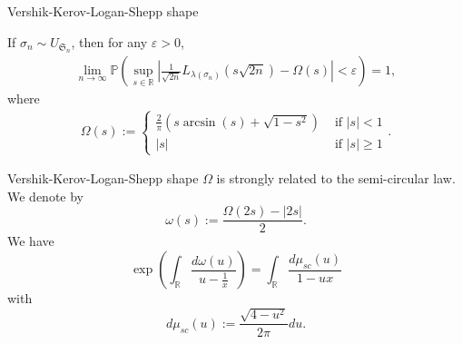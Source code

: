 \documentclass[english,xcolor=table]{beamer}
\begin{document}
\begin{frame}{Vershik-Kerov-Logan-Shepp shape}
    \begin{theorem}
    If $\sigma_n \sim U_{\mathfrak{S}_n}$, then for any $\varepsilon>0$,
\begin{align*}
\lim_{n\to \infty} \mathbb{P}\left(\sup_{s\in \mathbb{R}} \left|\frac{1}{\sqrt{2n}}L_{\lambda(\sigma_n)}\left({s}{\sqrt{2n}}\right)-\Omega(s)\right|<\varepsilon\right) =1,
\end{align*}
where
\begin{align*}
\Omega(s):=\begin{cases}
\frac{2}{\pi}(s\arcsin({s})+\sqrt{1-s^2}) & \text{ if } |s|<1 \\ 
|s| & \text{ if } |s|\geq 1 
\end{cases}.
\end{align*}
    \end{theorem}
    \vspace{10 mm}
\end{frame}
\begin{frame}{Vershik-Kerov-Logan-Shepp shape}
     $\Omega$ is strongly related to the semi-circular law.
\\
We denote by
$$ \omega(s):= \frac{\Omega(2s)-|2s|}{2}.$$	
We have
\begin{equation*}
\exp\left(\int_\mathbb{R} \frac{d\omega(u)}{u-\frac{1}{x}}\right)=\int_\mathbb{R} \frac{d\mu_{sc}(u)}{1-{u}{x}}
\end{equation*}
with 
$$d \mu_{sc}(u) := \frac{\sqrt{4-u^2}}{2\pi} du.
$$
\end{frame}
\end{document}
